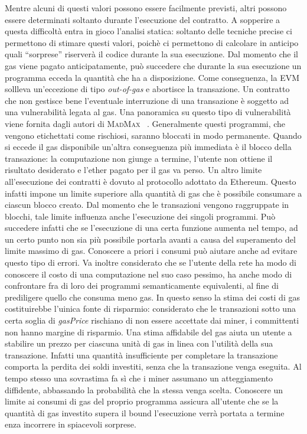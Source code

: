 	Mentre alcuni di questi valori possono essere facilmente previsti, altri possono essere determinati soltanto durante l'esecuzione del contratto. A sopperire a questa difficoltà entra in gioco l'analisi statica: soltanto delle tecniche precise ci permettono di stimare questi valori, poichè ci permettono di calcolare in anticipo quali ``sorprese'' riserverà il codice durante la sua esecuzione.\newline
	\indent Dal momento che il gas viene pagato anticipatamente, può succedere che durante la sua
	esecuzione un programma ecceda la quantità che ha a disposizione. Come conseguenza, la EVM
	sollleva un'eccezione di tipo \textit{out-of-gas} e abortisce la transazione. Un contratto
	che non gestisce bene l'eventuale interruzione di una transazione è soggetto ad una 
	vulnerabilità legata al gas. Una panoramica su questo tipo di vulnerabilità viene fornita dagli autori di \textsc{MadMax} ~\cite{grech2018madmax}. Generalmente questi programmi, che vengono etichettati
	come rischiosi, saranno bloccati in modo permanente.
	Quando si eccede il gas disponibile un'altra conseguenza più immediata è il
	blocco della transazione: la computazione non giunge a termine, l'utente non ottiene il
	risultato desiderato e l'ether pagato per il gas va perso.\newline
	\indent Un altro limite all'esecuzione dei contratti è dovuto al protocollo adottato da Ethereum.
	Questo infatti impone un limite superiore alla quantità di gas che è possibile consumare
	a ciascun blocco creato. Dal momento che le transazioni vengono raggruppate in blocchi,
	tale limite influenza anche l'esecuzione dei singoli programmi. Può succedere infatti che
	se l'esecuzione di una certa funzione aumenta nel tempo, ad un certo punto non sia
	più possibile portarla avanti a causa del superamento del limite massimo di gas.
	Conoscere a priori i consumi può aiutare anche ad evitare questo tipo di errori.\newline
	\indent Va inoltre considerato che se l'utente della rete ha modo di conoscere il costo
	di una computazione nel suo caso pessimo, ha anche modo di confrontare fra di loro dei programmi
	semanticamente equivalenti, al fine di prediligere quello che consuma meno gas.  In questo 
	senso la stima dei costi di gas costituirebbe l'uinica fonte di risparmio: considerato
	che le transazioni sotto una certa soglia di \textit{gasPrice} rischiano di non essere 
	accettate dai miner, i committenti non hanno margine di risparmio.\newline
	\indent Una stima affidabile del gas aiuta un utente a stabilire un prezzo per ciascuna
	unità di gas in linea con l'utilità della sua transazione. Infatti una quantità 
	insufficiente per completare la transazione comporta la perdita dei soldi investiti,
	senza che la transazione venga eseguita. Al tempo stesso una sovrastima fa sì che i
	miner assumano un atteggiamento diffidente, abbassando la probabilità che la stessa
	venga scelta.\newline
	\indent Conoscere un limite ai consumi di gas del proprio programma assicura all'utente
	che se la quantità di gas investito supera il bound l'esecuzione verrà portata a termine
	 enza incorrere in spiacevoli sorprese.


	\newpage
